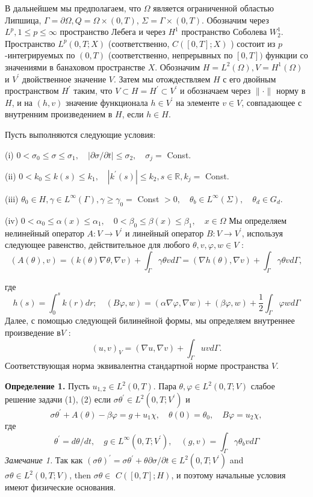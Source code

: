 В дальнейшем мы предполагаем, что $\Omega $ является ограниченной областью Липшица,
$\Gamma =\partial \Omega, Q =\Omega \times(0, T)$, $\Sigma=\Gamma \times(0, T)$.
Обозначим через $L ^ {p}, 1 \leq p \leq \infty$ пространство Лебега и через $H^{1}$
пространство Соболева $W_{2}^{1}$.
Пространство $L ^ {p}(0, T ; X)$ (соответственно, $C([0, T] ; X)$ ) состоит из
$p$-интегрируемых по $(0, T)$ (соответственно, непрерывных по $[0, T])$ функции со значениями
в банаховом пространстве $X$.
Обозначим $H=L ^{2}(\Omega), V=H^{1} (\Omega)$ и $V ^ {\prime}$ двойственное значение $V$.
Затем мы отождествляем $H $ с его двойным пространством $H ^ {\prime}$ таким,
что $V \subset H = H ^ {\prime} \subset V ^ {\prime}$ и обозначаем
через $ \|\cdot \|$ норму в $H$, и на $(h, v)$ значение функционала $h \in V ^ {\prime}$
на элементе $v  \in V$, совпадающее с внутренним произведением в $H$, если $h \in H$.


Пусть выполняются следующие условия:

(i) $0<\sigma_{0} \leq \sigma \leq \sigma_{1}, \quad|\partial \sigma / \partial t| \leq \sigma_{2}, \quad \sigma_{j}=$ Const.

(ii) $0<k_{0} \leq k(s) \leq k_{1}, \quad\left|k^{\prime}(s)\right| \leq k_{2}, s \in \mathbb{R}, k_{j}=$ Const.

(iii) $\theta_{0} \in H, \gamma \in L^{\infty}(\Gamma), \gamma \geq \gamma_{0}=$ Const $>0, \quad \theta_{b} \in L^{\infty}(\Sigma), \quad \theta_{d} \in G_{d}$.

(iv) $0<\alpha_{0} \leq \alpha(x) \leq \alpha_{1}, \quad 0<\beta_{0} \leq \beta(x) \leq \beta_{1}, \quad x \in \Omega$
Мы определяем нелинейный оператор $A:V\rightarrow V^{\prime}$
и линейный оператор $B:V\rightarrow V ^ {\prime}$,
используя следующее равенство, действительное для любого $\theta, v, \varphi, w \in V$ :
\[
    (A(\theta), v)=(k(\theta) \nabla \theta, \nabla v)+\int_{\Gamma} \gamma \theta v d
    \Gamma=(\nabla h(\theta), \nabla v)+\int_{\Gamma} \gamma \theta v d \Gamma,
\]

где%
\[
    h(s)=\int_{0}^{s} k(r) d r ; \quad(B \varphi, w)=
    (\alpha \nabla \varphi, \nabla w)+(\beta \varphi, w)+\frac{1}{2} \int_{\Gamma} \varphi w d \Gamma
\]
Далее, с помощью следующей билинейной формы, мы определяем внутреннее произведение в$V$ :
\[
    (u, v)_{V}=(\nabla u, \nabla v)+\int_{\Gamma} u v d \Gamma.
\]
Соответствующая норма эквивалентна стандартной норме пространства $V$.

\textbf{Определение 1.} Пусть $u_{1,2} \in L^{2}(0, T)$.
Пара $\theta, \varphi \in L^{2}(0, T ; V)$ слабое решение задачи (1), (2) если
$\sigma \theta^{\prime} \in L^{2}\left(0, T ; V^{\prime}\right)$ и
\[
    \sigma \theta^{\prime}+A(\theta)-\beta \varphi=g+u_{1} \chi, \quad \theta(0)=\theta_{0}, \quad B \varphi=u_{2} \chi,
\]
где
\[
    \theta^{\prime}=d \theta / d t, \quad g \in L^{\infty}\left(0, T ; V^{\prime}\right),
    \quad(g, v)=\int_{\Gamma} \gamma \theta_{b} v d \Gamma
\]
\textit{Замечание 1.} Так как $(\sigma \theta)^{\prime}=\sigma \theta^{\prime}+\theta
\partial \sigma / \partial t \in L^{2}\left(0, T ; V^{\prime}\right)$ and $\sigma
\theta \in L^{2}(0, T ; V)$, then $\sigma \theta \in$ $C([0, T] ; H)$, и поэтому начальные условия имеют физические основания.

